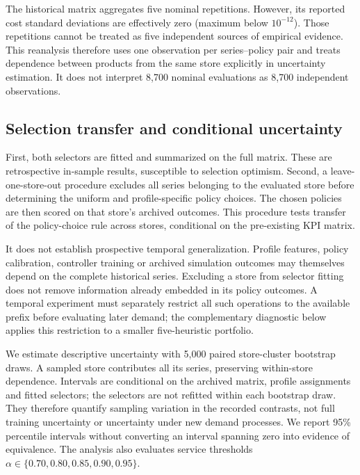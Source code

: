 \documentclass[preprint,12pt]{elsarticle}
\begin{document}
The historical matrix aggregates five nominal repetitions. However, its reported cost standard deviations are effectively zero (maximum below $10^{-12}$). Those repetitions cannot be treated as five independent sources of empirical evidence. This reanalysis therefore uses one observation per series--policy pair and treats dependence between products from the same store explicitly in uncertainty estimation. It does not interpret 8,700 nominal evaluations as 8,700 independent observations.

\subsection{Selection transfer and conditional uncertainty}
First, both selectors are fitted and summarized on the full matrix. These are retrospective in-sample results, susceptible to selection optimism. Second, a leave-one-store-out procedure excludes all series belonging to the evaluated store before determining the uniform and profile-specific policy choices. The chosen policies are then scored on that store's archived outcomes. This procedure tests transfer of the policy-choice rule across stores, conditional on the pre-existing KPI matrix.

It does not establish prospective temporal generalization. Profile features, policy calibration, controller training or archived simulation outcomes may themselves depend on the complete historical series. Excluding a store from selector fitting does not remove information already embedded in its policy outcomes. A temporal experiment must separately restrict all such operations to the available prefix before evaluating later demand; the complementary diagnostic below applies this restriction to a smaller five-heuristic portfolio.

We estimate descriptive uncertainty with 5,000 paired store-cluster bootstrap draws. A sampled store contributes all its series, preserving within-store dependence. Intervals are conditional on the archived matrix, profile assignments and fitted selectors; the selectors are not refitted within each bootstrap draw. They therefore quantify sampling variation in the recorded contrasts, not full training uncertainty or uncertainty under new demand processes. We report 95\% percentile intervals without converting an interval spanning zero into evidence of equivalence. The analysis also evaluates service thresholds $\alpha\in\{0.70,0.80,0.85,0.90,0.95\}$.
\end{document}
